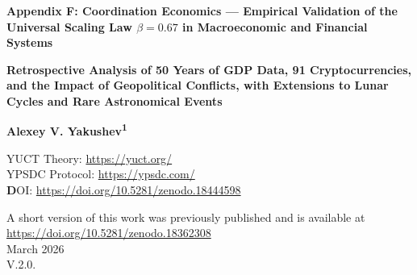 \documentclass[11pt,a4paper]{article}
\theoremstyle{remark}
\begin{document}
	
	\begin{titlepage}
		\begin{center}
			\vspace*{1cm}
			
			\Huge\textbf{Appendix F: Coordination Economics — Empirical Validation of the Universal Scaling Law $\beta = 0.67$ in Macroeconomic and Financial Systems}
			
			\vspace{0.5cm}
			\Large\textbf{Retrospective Analysis of 50 Years of GDP Data, 91 Cryptocurrencies, and the Impact of Geopolitical Conflicts, with Extensions to Lunar Cycles and Rare Astronomical Events}
			
			\vspace{1.5cm}
			
			\Large\textbf{Alexey V. Yakushev\textsuperscript{1}}
			
	YUCT Theory: \url{https://yuct.org/}\\
YPSDC Protocol: \url{https://ypsdc.com/}\\


\vspace{2cm}
\textbf DOI: \url{https://doi.org/10.5281/zenodo.18444598}\\

\vspace{1cm}

\vspace{0cm}
\large 
A short version of this work was previously published and is available at\\ \url{https://doi.org/10.5281/zenodo.18362308}\\
\vspace{1cm}
March 2026 \\ \large V.2.0.
			
			\vspace{2cm}
			

\end{center}
\end{titlepage}
\end{document}
